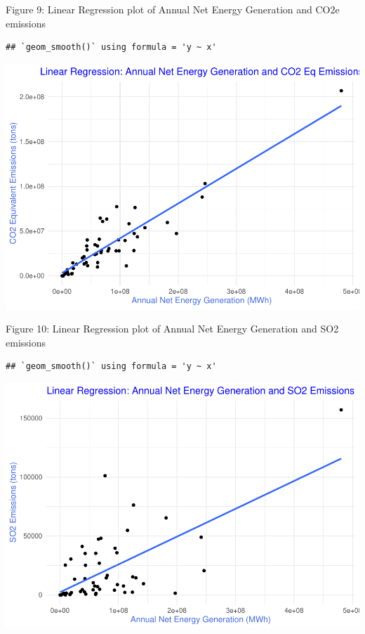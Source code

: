 \documentclass[
]{article}
\begin{document}
Figure 9: Linear Regression plot of Annual Net Energy Generation and
CO2e emissions

\begin{verbatim}
## `geom_smooth()` using formula = 'y ~ x'
\end{verbatim}

\begin{center}\includegraphics{EDA_Project_Mutha_Kry_Ghosh_VS_files/figure-latex/Q5_CO2e-1} \end{center}

Figure 10: Linear Regression plot of Annual Net Energy Generation and
SO2 emissions

\begin{verbatim}
## `geom_smooth()` using formula = 'y ~ x'
\end{verbatim}

\begin{center}\includegraphics{EDA_Project_Mutha_Kry_Ghosh_VS_files/figure-latex/Q5_SO2-1} \end{center}
\end{document}

